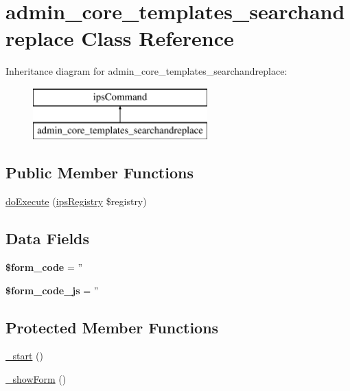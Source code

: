 \hypertarget{classadmin__core__templates__searchandreplace}{\section{admin\-\_\-core\-\_\-templates\-\_\-searchandreplace Class Reference}
\label{classadmin__core__templates__searchandreplace}
}
Inheritance diagram for admin\-\_\-core\-\_\-templates\-\_\-searchandreplace\-:\begin{figure}[H]
\begin{center}
\leavevmode
\includegraphics[height=2.000000cm]{classadmin__core__templates__searchandreplace}
\end{center}
\end{figure}
\subsection*{Public Member Functions}
\begin{DoxyCompactItemize}
\item 
\hyperlink{classadmin__core__templates__searchandreplace_afbc4e912a0604b94d47d66744c64d8ba}{do\-Execute} (\hyperlink{classips_registry}{ips\-Registry} \$registry)
\end{DoxyCompactItemize}
\subsection*{Data Fields}
\begin{DoxyCompactItemize}
\item 
\hypertarget{classadmin__core__templates__searchandreplace_af28aee726fa3eb6c355d08a2ab655e03}{{\bfseries \$form\-\_\-code} = ''}\label{classadmin__core__templates__searchandreplace_af28aee726fa3eb6c355d08a2ab655e03}

\item 
\hypertarget{classadmin__core__templates__searchandreplace_ac68fe8a02a2efd63c3271179f4b4fbb7}{{\bfseries \$form\-\_\-code\-\_\-js} = ''}\label{classadmin__core__templates__searchandreplace_ac68fe8a02a2efd63c3271179f4b4fbb7}

\end{DoxyCompactItemize}
\subsection*{Protected Member Functions}
\begin{DoxyCompactItemize}
\item 
\hyperlink{classadmin__core__templates__searchandreplace_a43c71a826f71b672a21bd66606543789}{\-\_\-start} ()
\item 
\hyperlink{classadmin__core__templates__searchandreplace_a5741a03d8eba52b11a74e90df95f1ab8}{\-\_\-show\-Form} ()
\end{DoxyCompactItemize}
